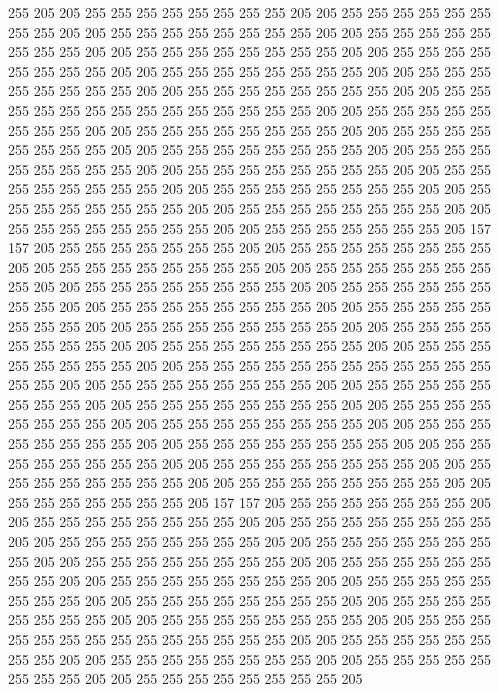 255 205 205 255 255 255 255 255 255 255 255 205 205 255 255 255 255 255 255 255
255 205 205 255 255 255 255 255 255 255 255 205 205 255 255 255 255 255 255 255
255 205 205 255 255 255 255 255 255 255 255 205 205 255 255 255 255 255 255 255
255 205 205 255 255 255 255 255 255 255 255 205 205 255 255 255 255 255 255 255
255 205 205 255 255 255 255 255 255 255 255 205 205 255 255 255 255 255 255 255
255 255 255 255 255 255 255 205 205 255 255 255 255 255 255 255 255 205 205 255
255 255 255 255 255 255 255 205 205 255 255 255 255 255 255 255 255 205 205 255
255 255 255 255 255 255 255 205 205 255 255 255 255 255 255 255 255 205 205 255
255 255 255 255 255 255 255 205 205 255 255 255 255 255 255 255 255 205 205 255
255 255 255 255 255 255 255 205 205 255 255 255 255 255 255 255 255 205 205 255
255 255 255 255 255 255 255 205 205 255 255 255 255 255 255 255 255 205 205 255
255 255 255 255 255 255 205 157 157 205 255 255 255 255 255 255 255 205 205 255
255 255 255 255 255 255 255 205 205 255 255 255 255 255 255 255 255 205 205 255
255 255 255 255 255 255 255 205 205 255 255 255 255 255 255 255 255 205 205 255
255 255 255 255 255 255 255 205 205 255 255 255 255 255 255 255 255 205 205 255
255 255 255 255 255 255 255 205 205 255 255 255 255 255 255 255 255 205 205 255
255 255 255 255 255 255 255 205 205 255 255 255 255 255 255 255 255 205 205 255
255 255 255 255 255 255 255 205 205 255 255 255 255 255 255 255 255 255 255 255
255 255 255 205 205 255 255 255 255 255 255 255 255 205 205 255 255 255 255 255
255 255 255 205 205 255 255 255 255 255 255 255 255 205 205 255 255 255 255 255
255 255 255 205 205 255 255 255 255 255 255 255 255 205 205 255 255 255 255 255
255 255 255 205 205 255 255 255 255 255 255 255 255 205 205 255 255 255 255 255
255 255 255 205 205 255 255 255 255 255 255 255 255 205 205 255 255 255 255 255
255 255 255 205 205 255 255 255 255 255 255 255 255 205 205 255 255 255 255 255
255 255 205 157 157 205 255 255 255 255 255 255 255 205 205 255 255 255 255 255
255 255 255 205 205 255 255 255 255 255 255 255 255 205 205 255 255 255 255 255
255 255 255 205 205 255 255 255 255 255 255 255 255 205 205 255 255 255 255 255
255 255 255 205 205 255 255 255 255 255 255 255 255 205 205 255 255 255 255 255
255 255 255 205 205 255 255 255 255 255 255 255 255 205 205 255 255 255 255 255
255 255 255 205 205 255 255 255 255 255 255 255 255 205 205 255 255 255 255 255
255 255 255 205 205 255 255 255 255 255 255 255 255 255 255 255 255 255 255 205
205 255 255 255 255 255 255 255 255 205 205 255 255 255 255 255 255 255 255 205
205 255 255 255 255 255 255 255 255 205 205 255 255 255 255 255 255 255 255 205
